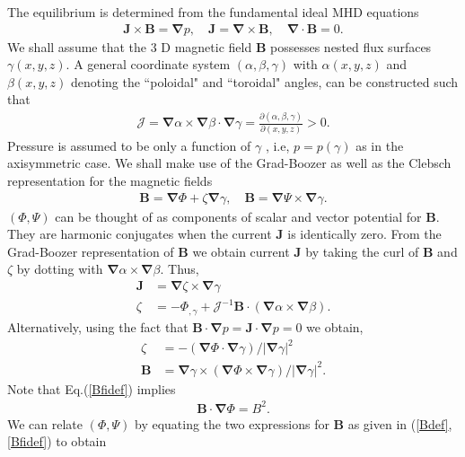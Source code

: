 \documentclass[aip,pop,reprint]{revtex4-1}
\newcommand*{\B}{\bm{B}}
\newcommand*{\J}{\bm{J}}
\newcommand*{\Jac}{\mathscr{J}}
\newcommand*{\dl}{\bm{\nabla}}
\newcommand*{\lbr}{\left(}
\newcommand*{\rbr}{\right)}
\begin{document}
The equilibrium is determined from the fundamental ideal MHD equations
\begin{align}
\J \times \B = \dl p, \quad \J= \dl \times \B, \quad \dl \cdot \B =0. \label{MHD}
\end{align}
We shall assume that the 3 D magnetic field $\B$ possesses nested flux surfaces $\gamma(x,y,z)$. A general coordinate system $(\alpha,\beta,\gamma)$ with $\alpha(x,y,z)$ and $\beta(x,y,z)$ denoting the ``poloidal" and ``toroidal" angles, can be constructed such that
\begin{align}
\Jac= \dl \alpha \times \dl \beta \cdot \dl \gamma = \frac{\partial(\alpha,\beta,\gamma)}{\partial(x,y,z)}>0.
\label{Jacdef}
\end{align}
 Pressure is assumed to be only a function of $\gamma$ , i.e, $p=p(\gamma)$ as in the axisymmetric case. We shall make use of the Grad-Boozer as well as the Clebsch representation for the magnetic fields
\begin{align}
\B= \dl \Phi + \zeta \dl \gamma, \quad \B= \dl \Psi \times \dl \gamma. \label{Bdef}
\end{align} 
$(\Phi,\Psi)$ can be thought of as components of scalar and vector potential for $\B$. They are harmonic conjugates when the current $\J$ is identically zero. From the Grad-Boozer representation of $\B$ we obtain current $\J$ by taking the curl of $\B$ and $\zeta$ by dotting with $\dl \alpha\times \dl \beta$. Thus,
\begin{subequations}
\begin{align}
    \J &= \dl \zeta \times \dl \gamma \label{Jdef}\\
    \zeta &= -\Phi_{,\gamma}+\Jac^{-1}\B\cdot \lbr \dl \alpha \times \dl \beta \rbr.  \label{zetdef}
\end{align}
\end{subequations}
Alternatively, using the fact that $\B\cdot \dl p =\J\cdot \dl p=0$ we obtain,
\begin{subequations}
\begin{align}
\zeta &= -(\dl \Phi\cdot \dl \gamma)/|\dl \gamma|^2 \label{altzetdef}\\
\B &= \dl \gamma \times (\dl \Phi\times \dl \gamma)/|\dl \gamma|^2 . \label{Bfidef}
\end{align}
\end{subequations}
Note that Eq.(\ref{Bfidef}) implies
\begin{align}
\B\cdot\dl \Phi=B^2. \label{Bdfi}
\end{align}
We can relate $(\Phi,\Psi)$ by equating the two expressions for $\B$ as given in (\ref{Bdef},\ref{Bfidef}) to obtain
\end{document}
